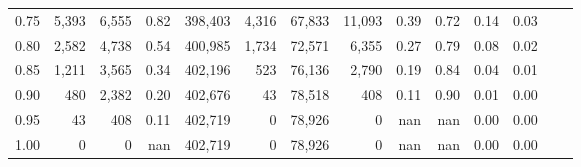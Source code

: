 \begin{tabular}{rrrrrrrrrrrrrr}
0.75 &   5,393 &  6,555 &    0.82 &  398,403 &    4,316 &  67,833 &  11,093 &  0.39 &  0.72 &  0.14 &      0.03 \\
0.80 &   2,582 &  4,738 &    0.54 &  400,985 &    1,734 &  72,571 &   6,355 &  0.27 &  0.79 &  0.08 &      0.02 \\
0.85 &   1,211 &  3,565 &    0.34 &  402,196 &      523 &  76,136 &   2,790 &  0.19 &  0.84 &  0.04 &      0.01 \\
0.90 &     480 &  2,382 &    0.20 &  402,676 &       43 &  78,518 &     408 &  0.11 &  0.90 &  0.01 &      0.00 \\
0.95 &      43 &    408 &    0.11 &  402,719 &        0 &  78,926 &       0 &   nan &   nan &  0.00 &      0.00 \\
1.00 &       0 &      0 &     nan &  402,719 &        0 &  78,926 &       0 &   nan &   nan &  0.00 &      0.00 \\
\bottomrule
\end{tabular}
